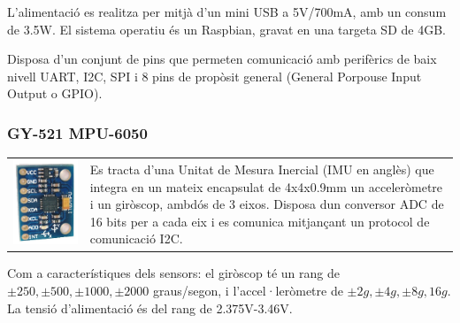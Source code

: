 \documentclass[twoside]{article}
\begin{document}
L'alimentació es realitza per mitjà d'un mini USB a 5V/700mA, amb un consum de 3.5W. El sistema operatiu és un Raspbian, gravat en una targeta SD de 4GB. 

Disposa d'un conjunt de pins que permeten comunicació amb perifèrics de baix nivell UART, I2C, SPI i 8 pins de propòsit general (General Porpouse Input Output o GPIO).

\subsubsection*{GY-521 MPU-6050}
\begin{table}[!h]
\begin{tabular}{m{1.5cm}m{12cm}}
\hspace{1cm}\includegraphics[scale=0.1]{mpu-6050.jpg} & Es tracta d'una Unitat de Mesura Inercial (IMU en anglès) que integra en un mateix encapsulat de 4x4x0.9mm un acceleròmetre i un giròscop, ambdós de 3 eixos. Disposa dun conversor ADC de 16 bits per a cada eix i es comunica mitjançant un protocol de comunicació I2C.\\
\end{tabular}
\end{table}
Com a característiques dels sensors: el giròscop té un rang de  $\pm250,\pm500,\pm1000,\pm2000$ graus/segon, i l'accel·leròmetre de $\pm2g,\pm4g,\pm8g,16g$. La tensió d'alimentació és del rang de 2.375V-3.46V.
\end{document}
